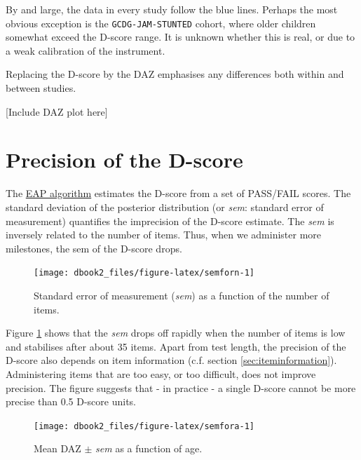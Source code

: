 \documentclass[
]{book}
\begin{document}
By and large, the data in every study follow the blue lines. Perhaps the most obvious exception is the \texttt{GCDG-JAM-STUNTED} cohort, where older children somewhat exceed the D-score range. It is unknown whether this is real, or due to a weak calibration of the instrument.

Replacing the D-score by the DAZ emphasises any differences both within and between studies.

{[}Include DAZ plot here{]}

\hypertarget{sec:sem}{%
\section{Precision of the D-score}\label{sec:sem}}

The \href{https://d-score.org/dbook1/sec-dscoreestimation.html\#eap-algorithm-numerical-example}{EAP algorithm} estimates the D-score from a set of PASS/FAIL scores. The standard deviation of the posterior distribution (or \emph{sem}: standard error of measurement) quantifies the imprecision of the D-score estimate. The \emph{sem} is inversely related to the number of items. Thus, when we administer more milestones, the sem of the D-score drops.

\begin{figure}

{\centering \texttt{[image: dbook2\_files/figure-latex/semforn-1]} 

}

\caption{Standard error of measurement (\emph{sem}) as a function of the number of items.}\label{fig:semforn}
\end{figure}



Figure \ref{fig:semforn} shows that the \emph{sem} drops off rapidly when the number of items is low and stabilises after about 35 items. Apart from test length, the precision of the D-score also depends on item information (c.f. section \ref{sec:iteminformation}). Administering items that are too easy, or too difficult, does not improve precision. The figure suggests that - in practice - a single D-score cannot be more precise than 0.5 D-score units.

\begin{figure}

{\centering \texttt{[image: dbook2\_files/figure-latex/semfora-1]} 

}

\caption{Mean DAZ \(\pm\) \emph{sem} as a function of age.}\label{fig:semfora}
\end{figure}
\end{document}
